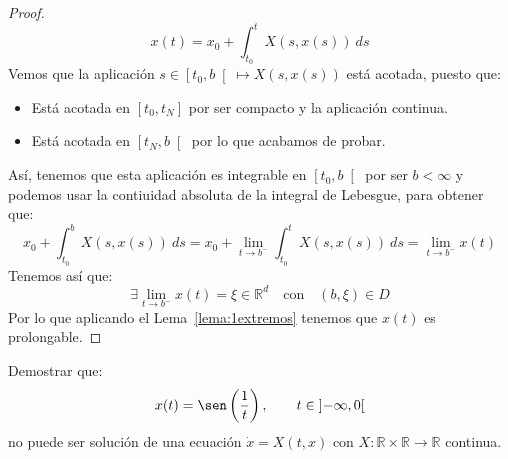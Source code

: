 \begin{lema}
\begin{proof}
        \begin{equation*}
            x(t) = x_0 + \int_{t_0}^{t} X(s,x(s))~ds 
        \end{equation*}
        Vemos que la aplicación $s\in \left[t_0,b\right[\mapsto X(s,x(s))$ está acotada, puesto que:
        \begin{itemize}
            \item Está acotada en $[t_0,t_N]$ por ser compacto y la aplicación continua.
            \item Está acotada en $\left[t_N,b\right[$ por lo que acabamos de probar.
        \end{itemize}
        Así, tenemos que esta aplicación es integrable en $\left[t_0,b\right[$ por ser $b<\infty$ y podemos usar la contiuidad absoluta de la integral de Lebesgue, para obtener que:
        \begin{equation*}
            x_0 + \int_{t_0}^{b} X(s,x(s))~ds = x_0 + \lim_{t\to b^-}\int_{t_0}^{t} X(s,x(s))~ds  = \lim_{t\to b^-}x(t)
        \end{equation*}
        Tenemos así que:
        \begin{equation*}
            \exists \lim_{t\to b^-}x(t) = \xi \in \mathbb{R}^d \quad \text{con}\quad (b,\xi) \in D
        \end{equation*}
        Por lo que aplicando el Lema~\ref{lema:1extremos} tenemos que $x(t)$ es prolongable.

    \end{proof}
\end{lema}

\begin{ejercicio}
    Demostrar que:
    \begin{equation*}
        x(t) = \sen\left(\frac{1}{t}\right), \qquad t\in \left]-\infty,0\right[
    \end{equation*}
    no puede ser solución de una ecuación $\dot{x}=X(t,x)$ con $X:\mathbb{R}\times\mathbb{R}\to \mathbb{R}$ continua.
\end{ejercicio}


